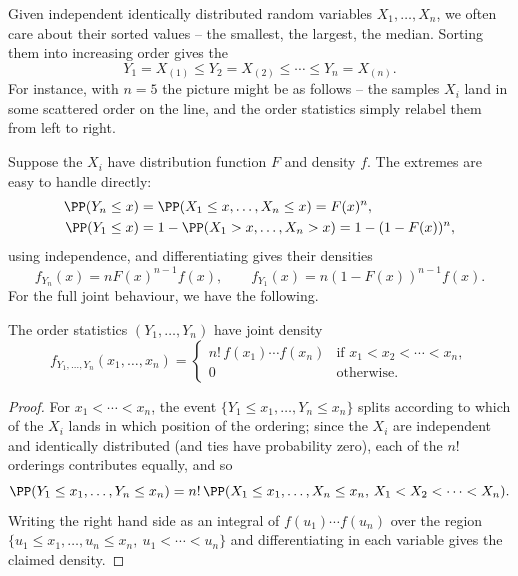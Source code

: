 Given independent identically distributed random variables $X_1, \dots, X_n$, we often care about their sorted values -- the smallest, the largest, the median. Sorting them into increasing order gives the 
$$
Y_1 = X_{(1)} \leq Y_2 = X_{(2)} \leq \cdots \leq Y_n = X_{(n)}.
$$
For instance, with $n = 5$ the picture might be as follows -- the samples $X_i$ land in some scattered order on the line, and the order statistics simply relabel them from left to right.
\begin{center}
\end{center}
Suppose the $X_i$ have distribution function $F$ and density $f$. The extremes are easy to handle directly:
\begin{align*}
	\PP(Y_n \leq x) &= \PP(X_1 \leq x, \dots, X_n \leq x) = F(x)^n, \\
	\PP(Y_1 \leq x) &= 1 - \PP(X_1 > x, \dots, X_n > x) = 1 - (1 - F(x))^n,
\end{align*}
using independence, and differentiating gives their densities
$$
f_{Y_n}(x) = nF(x)^{n - 1}f(x), \qquad f_{Y_1}(x) = n(1 - F(x))^{n-1} f(x).
$$
For the full joint behaviour, we have the following.

\begin{proposition}
	The order statistics $(Y_1, \dots, Y_n)$ have joint density
	$$
	f_{Y_1, \dots, Y_n}(x_1, \dots, x_n) = \begin{cases}
		n! \, f(x_1) \cdots f(x_n) & \text{if } x_1 < x_2 < \cdots < x_n, \\
		0 & \text{otherwise.}
	\end{cases}
	$$
\end{proposition}
\begin{proof}
	For $x_1 < \cdots < x_n$, the event $\{Y_1 \leq x_1, \dots, Y_n \leq x_n\}$ splits according to which of the $X_i$ lands in which position of the ordering; since the $X_i$ are independent and identically distributed (and ties have probability zero), each of the $n!$ orderings contributes equally, and so
	$$
	\PP(Y_1 \leq x_1, \dots, Y_n \leq x_n) = n! \,\PP(X_1 \leq x_1, \dots, X_n \leq x_n, \, X_1 < X_2 < \cdots < X_n).
	$$
	Writing the right hand side as an integral of $f(u_1)\cdots f(u_n)$ over the region $\{u_1 \leq x_1, \dots, u_n \leq x_n,\ u_1 < \cdots < u_n\}$ and differentiating in each variable gives the claimed density.
\end{proof}

